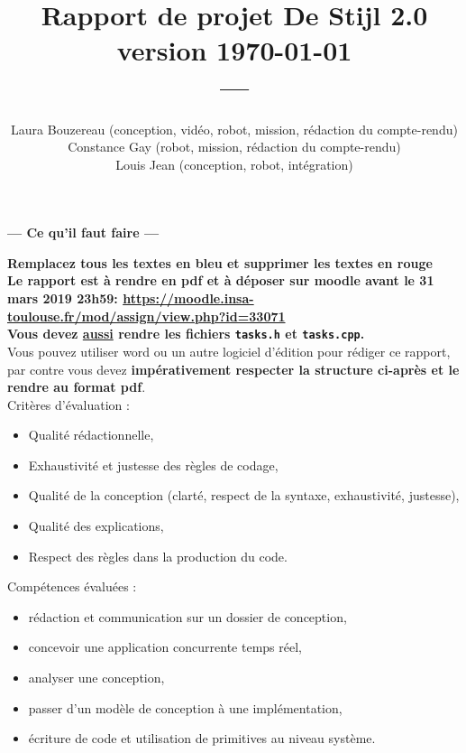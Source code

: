 \documentclass[11pt, a4paper]{paper}
\title{{\Huge Rapport de projet De Stijl 2.0}\\
{\large version \today}\\
---\\
}
\author{{Laura Bouzereau (conception, vidéo, robot, mission, rédaction du compte-rendu)}\\
{Constance Gay (robot, mission, rédaction du compte-rendu)}\\
{Louis Jean (conception, robot, intégration)}\\
}
\begin{document}
\maketitle


{\color{red}
\begin{framed}
\begin{center}{\bf\Large --- Ce qu'il faut faire --- } \end{center}

{\bf Remplacez tous les textes en bleu et supprimer les textes en rouge}\\


{\bf Le rapport est à rendre en pdf et à déposer sur moodle avant le 31 mars 2019 23h59:
\url{https://moodle.insa-toulouse.fr/mod/assign/view.php?id=33071}}\\

{\bf Vous devez \underline{aussi} rendre les fichiers {\tt tasks.h} et {\tt tasks.cpp}.}\\

Vous pouvez utiliser word ou un autre logiciel d'édition pour rédiger ce rapport, par contre vous devez  {\bf impérativement respecter la structure ci-après et le rendre au format pdf}.\\


Critères d'évaluation :
\begin{itemize}
	\item Qualité rédactionnelle,
	\item Exhaustivité et justesse des règles de codage,
	\item Qualité de la conception (clarté, respect de la syntaxe, exhaustivité, justesse),
	\item Qualité des explications,
	\item Respect des règles dans la production du code.\\
\end{itemize}

Compétences évaluées :
\begin{itemize}
	\item rédaction et communication sur un dossier de conception,
	\item concevoir une application concurrente temps réel,
	\item analyser une conception,
	\item passer d'un modèle de conception à une implémentation,
	\item écriture de code et utilisation de primitives au niveau système.
\end{itemize}
\end{framed}
}
\end{document}
